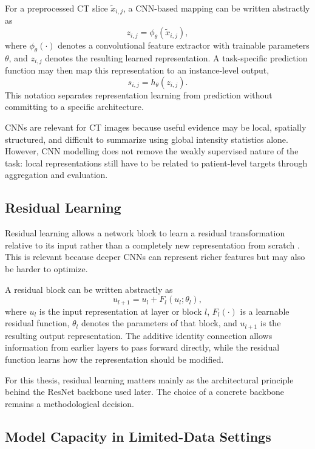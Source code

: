 For a preprocessed CT slice \(\tilde{x}_{i,j}\), a CNN-based mapping can be written abstractly as
\[
z_{i,j} = \phi_{\theta}(\tilde{x}_{i,j}),
\]
where \(\phi_{\theta}(\cdot)\) denotes a convolutional feature extractor with trainable parameters \(\theta\), and \(z_{i,j}\) denotes the resulting learned representation. A task-specific prediction function may then map this representation to an instance-level output,
\[
s_{i,j} = h_{\theta}(z_{i,j}).
\]
This notation separates representation learning from prediction without committing to a specific architecture.

CNNs are relevant for CT images because useful evidence may be local, spatially structured, and difficult to summarize using global intensity statistics alone. However, CNN modelling does not remove the weakly supervised nature of the task: local representations still have to be related to patient-level targets through aggregation and evaluation.


\subsection{Residual Learning}
\label{sec:residual_learning}

Residual learning allows a network block to learn a residual transformation relative to its input rather than a completely new representation from scratch \cite{he2016residual}. This is relevant because deeper CNNs can represent richer features but may also be harder to optimize.

A residual block can be written abstractly as
\[
u_{l+1} = u_l + F_l(u_l; \theta_l),
\]
where \(u_l\) is the input representation at layer or block \(l\), \(F_l(\cdot)\) is a learnable residual function, \(\theta_l\) denotes the parameters of that block, and \(u_{l+1}\) is the resulting output representation. The additive identity connection allows information from earlier layers to pass forward directly, while the residual function learns how the representation should be modified.

For this thesis, residual learning matters mainly as the architectural principle behind the ResNet backbone used later. The choice of a concrete backbone remains a methodological decision.


\subsection{Model Capacity in Limited-Data Settings}
\label{sec:model_capacity_limited_data}

